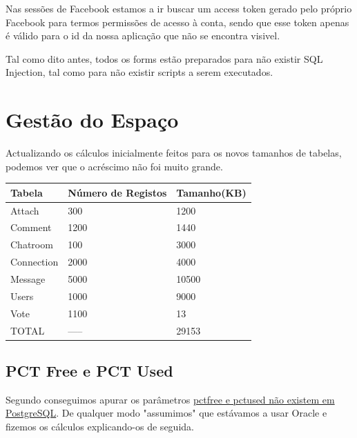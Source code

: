 \documentclass[a4paper, 12pt]{article}
\begin{document}
Nas sessões de Facebook estamos a ir buscar um access token gerado pelo próprio Facebook para termos permissões de acesso à conta, sendo que esse token apenas é válido para o id da nossa aplicação que não se encontra visivel.

Tal como dito antes, todos os forms estão preparados para não existir SQL Injection, tal como para não existir scripts a serem executados.
\cleardoublepage

\section{Gestão do Espaço}
\indent \indent Actualizando os cálculos inicialmente feitos para os novos tamanhos de tabelas, podemos ver que o acréscimo não foi muito grande.
\begin{center}
    \begin{tabular}{|p{4cm} | p{4cm} | p{4cm} |} \hline
        \textbf{Tabela}          &   \textbf{Número de Registos}      &   \textbf{Tamanho(KB)} \\ \hline
        Attach          &          300              &    1200       \\ \hline
        Comment         &          1200             &    1440       \\ \hline
        Chatroom        &          100              &    3000       \\ \hline
        Connection      &          2000             &    4000       \\ \hline
        Message         &          5000             &   10500       \\ \hline
        Users           &          1000             &    9000       \\ \hline
        Vote            &          1100             &      13       \\ \hline
        TOTAL           &        \------            &   29153       \\ \hline
    \end{tabular}
\end{center}

\subsection{PCT Free e PCT Used}
\indent \indent Segundo conseguimos apurar os parâmetros \href{http://www-2.cs.cmu.edu/~pmerson/docs/OracleToPostgres.pdf}{pctfree e pctused não existem em PostgreSQL}. De qualquer modo "assumimos" que estávamos a usar Oracle e fizemos os cálculos explicando-os de seguida.
\end{document}
